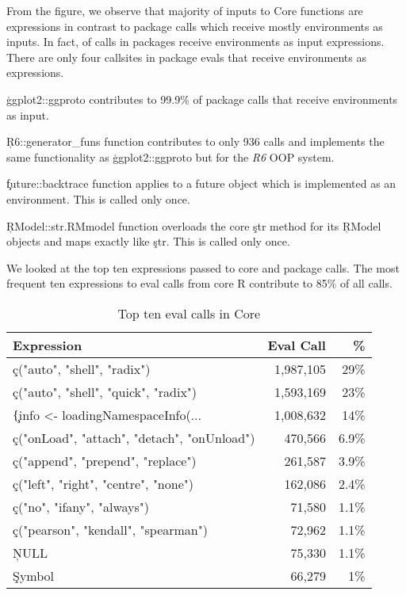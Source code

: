 \documentclass[USenglish,cleveref, autoref, thm-restate]{lipics-v2019}
\begin{document}
From the figure, we observe that majority of inputs to Core \eval functions
are expressions in contrast to package \eval calls which receive mostly
environments as inputs. In fact, \PackageEnvironmentInputEvalCallPerc of
\eval calls in packages receive environments as input expressions. There are
only four callsites in package evals that receive environments as
expressions.
\begin{compactitem}[$-$]
\item \c{ggplot2::ggproto} contributes to 99.9\% of package \eval calls that
  receive environments as input.
\item \c{R6::generator_funs} function contributes to only 936 \eval calls and
implements the same functionality as \c{ggplot2::ggproto} but for the \emph{R6}
OOP system.
\item \c{future::backtrace} function applies \eval to a future object which
  is implemented as an environment. This is called only once.
\item \c{RModel::str.RMmodel} function overloads the core \c{str} method for its
\c{RModel} objects and maps \eval exactly like \c{str}. This is called only
once.
\end{compactitem}

We looked at the top ten expressions passed to core and package \eval
calls. The most frequent ten expressions to eval calls from core R
contribute to 85\% of all \eval calls.

\begin{table}[!h] \centering
\begin{tabular}{@{}l|rr@{}} \hline
Expression & Eval Call &  \% \\\hline
\c{c("auto", "shell", "radix")} & 1,987,105 & 29\%\\
\c{c("auto", "shell", "quick", "radix")} & 1,593,169  & 23\%\\
\c{\{info <- loadingNamespaceInfo(...} & 1,008,632 &       14\%\\
\c{c("onLoad", "attach", "detach", "onUnload")}   & 470,566 &      6.9\%\\
\c{c("append", "prepend", "replace")} &              261,587&       3.9\% \\
\c{c("left", "right", "centre", "none")} & 162,086     & 2.4\%\\
\c{c("no", "ifany", "always")}   &                71,580 &       1.1\%\\
\c{c("pearson", "kendall", "spearman")}  & 72,962 &      1.1\%\\
\c{NULL}& 75,330  &      1.1\% \\
\c{Symbol}&                 66,279&       1\%\\\hline
\end{tabular}
\caption{Top ten eval calls in Core}\label{B}
\end{table}
\end{document}
